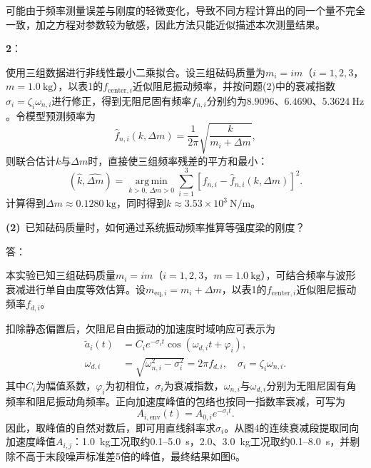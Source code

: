 \documentclass[12pt, oneside, a4paper]{ctexart}
\begin{document}
\par{}
可能由于频率测量误差与刚度的轻微变化，导致不同方程计算出的同一个量不完全一致，加之方程对参数较为敏感，因此方法只能近似描述本次测量结果。
\par{}
{\textbf{2}{\heiti{}：}}
\par{}
使用三组数据进行非线性最小二乘拟合。设三组砝码质量为$m_i=i m$（$i=1,2,3$，$m=1.0~\mathrm{kg}$），以表1的$f_{\mathrm{center},i}$近似阻尼振动频率，并按问题(2)中的衰减指数$\sigma_i = \zeta_i\omega_{n,i}$进行修正，得到无阻尼固有频率$f_{n,i}$分别约为$8.9096$、$6.4690$、$5.3624~\mathrm{Hz}$。令模型预测频率为
\begin{equation*}
    \widehat f_{n,i}(k,\Delta m)=\frac{1}{2\pi}\sqrt{\frac{k}{m_i+\Delta m}},
\end{equation*}
则联合估计$k$与$\Delta m$时，直接使三组频率残差的平方和最小：
\begin{equation*}
    (\widehat k,\widehat{\Delta m})
    =\underset{k>0,\,\Delta m>0}{\operatorname{arg\,min}}
    \sum_{i=1}^{3}\left[f_{n,i}-\widehat f_{n,i}(k,\Delta m)\right]^2.
\end{equation*}
计算得到$\Delta m\approx0.1280~\mathrm{kg}$，同时得到$k\approx3.53\times10^3~\mathrm{N/m}$。
\par\noindent{}
\textbf{(2)}{\heiti~已知砝码质量时，如何通过系统振动频率推算等强度梁的刚度？}
\par{}
{\setlength{\parindent}{0pt}\heiti{}答：}
\par{}
本实验已知三组砝码质量$m_i=i m$（$i=1,2,3$，$m=1.0~\mathrm{kg}$），可结合频率与波形衰减进行单自由度等效估算。设$m_{\mathrm{eq},i}=m_i+\Delta m$，以表1的$f_{\mathrm{center},i}$近似阻尼振动频率$f_{d,i}$。
\par{}
扣除静态偏置后，欠阻尼自由振动的加速度时域响应可表示为
\begin{align*}
    \widetilde a_i(t) & = C_i e^{-\sigma_i t}\cos(\omega_{d,i}t+\varphi_i),      \\
    \omega_{d,i}      & =\sqrt{\omega_{n,i}^{2}-\sigma_i^{2}}=2\pi f_{d,i},\quad
    \sigma_i = \zeta_i\omega_{n,i}.
\end{align*}
其中$C_i$为幅值系数，$\varphi_i$为初相位，$\sigma_i$为衰减指数，$\omega_{n,i}$与$\omega_{d,i}$分别为无阻尼固有角频率和阻尼振动角频率。正向加速度峰值的包络也按同一指数率衰减，可写为
\begin{equation*}
    A_{i,\mathrm{env}}(t)=A_{0,i}e^{-\sigma_i t}.
\end{equation*}
因此，取峰值的自然对数后，即可用直线斜率求$\sigma_i$。从图4的连续衰减段提取同向加速度峰值$A_{i,j}$：1.0~kg工况取约0.1--5.0~s，2.0、3.0~kg工况取约0.1--8.0~s，并剔除不高于末段噪声标准差5倍的峰值，最终结果如图6。
\end{document}
